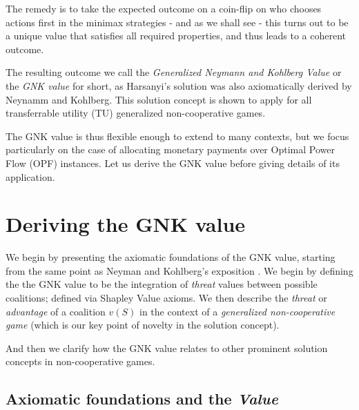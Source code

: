 The remedy is to take the expected outcome on a coin-flip on who chooses actions first in the minimax strategies - and as we shall see - this turns out to be a unique value that satisfies all required properties, and thus leads to a coherent outcome.

The resulting outcome we call the \textit{Generalized Neymann and Kohlberg Value} or the \textit{GNK value} for short, 
as Harsanyi's solution was also axiomatically derived by Neynamm and Kohlberg.\cite{value2,KOHLBERG2018139}
This solution concept is shown to apply for all transferrable utility (TU) generalized non-cooperative games.

The GNK value is thus flexible enough to extend to many contexts, but we focus particularly on the case of allocating monetary payments over Optimal Power Flow (OPF) instances.
Let us derive the GNK value before giving details of its application.

\section{Deriving the GNK value}\label{the_value_def2}

We begin by presenting the axiomatic foundations of the GNK value, starting from the same point as Neyman and Kohlberg's exposition \cite{value2}.
We begin by defining the the GNK value to be the integration of \emph{threat} values between possible coalitions; defined via Shapley Value axioms.
We then describe the \emph{threat} or \emph{advantage} of a coalition $v(S)$ in the context of a \textit{generalized non-cooperative game} (which is our key point of novelty in the solution concept).

And then we clarify how the GNK value relates to other prominent solution concepts in non-cooperative games.

\subsection{Axiomatic foundations and the \textit{Value}}\label{the_value_def}



